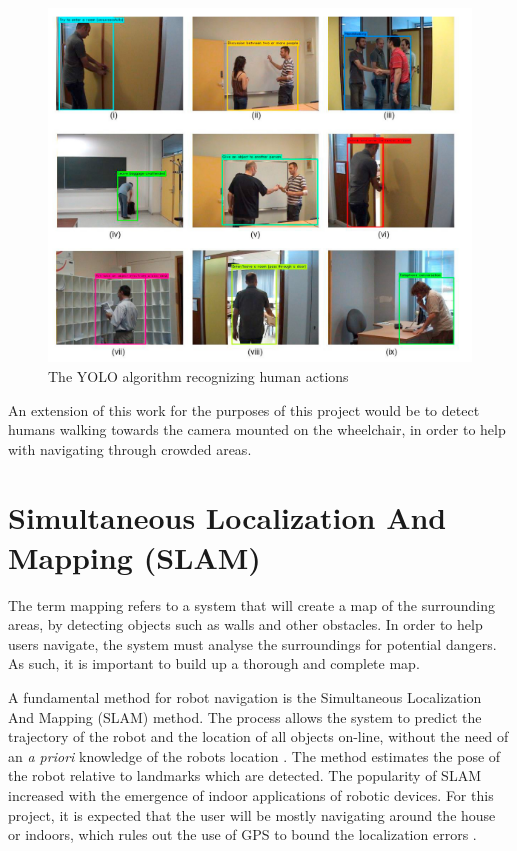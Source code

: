 \documentclass[12pt,a4paper]{report}
\begin{document}
\begin{figure}[h!]
	\begin{center}
		\includegraphics[scale=0.4]{Images/Literature/YOLO_Action_Recognition.png}
		\caption{The YOLO algorithm recognizing human actions \citep{Shinde2018}}
	\end{center}
\end{figure}

An extension of this work for the purposes of this project would be to detect humans walking towards the camera mounted on the wheelchair, in order to help with navigating through crowded areas.


\section{Simultaneous Localization And Mapping (SLAM)}
The term mapping refers to a system that will create a map of the surrounding areas, by detecting objects such as walls and other obstacles. In order to help users navigate, the system must analyse the surroundings for potential dangers. As such, it is important to build up a thorough and complete map.

A fundamental method for robot navigation is the Simultaneous Localization And Mapping (SLAM) method. The process allows the system to predict the trajectory of the robot and the location of all objects on-line, without the need of an \textit{a priori} knowledge of the robots location \citep{Bailey2006a}. The method estimates the pose of the robot relative to landmarks which are detected. The popularity of SLAM increased with the emergence of indoor applications of robotic devices. For this project, it is expected that the user will be mostly navigating around the house or indoors, which rules out the use of GPS to bound the localization errors \citep{Cadena2016}.
\end{document}
